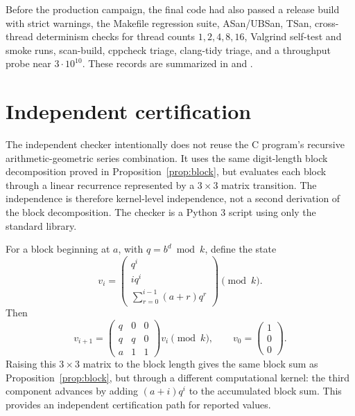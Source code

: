 \documentclass[11pt]{article}
\theoremstyle{definition}
\theoremstyle{remark}
\begin{document}
Before the production campaign, the final code had also passed a release
build with strict warnings, the Makefile regression suite, ASan/UBSan, TSan,
cross-thread determinism checks for thread counts \(1,2,4,8,16\), Valgrind
self-test and smoke runs, scan-build, cppcheck triage, clang-tidy triage, and
a throughput probe near \(3\cdot 10^{10}\).  These records are summarized in
 and
.

\section{Independent certification}
\label{sec:validation}

The independent checker  intentionally does
not reuse the C program's recursive arithmetic-geometric series combination.
It uses the same digit-length block decomposition proved in
Proposition~\ref{prop:block}, but evaluates each block through a linear
recurrence represented by a \(3\times 3\) matrix transition.  The independence is
therefore kernel-level independence,
not a second derivation of the block decomposition.  The checker is a Python 3
script using only the standard library.

For a block beginning at \(a\), with \(q=b^d\bmod k\), define the state
\[
  v_i=\begin{pmatrix}q^i\\ i q^i\\
  \sum_{r=0}^{i-1}(a+r)q^r\end{pmatrix}\pmod{k}.
\]
Then
\[
  v_{i+1} =
  \begin{pmatrix}
  q & 0 & 0\\
  q & q & 0\\
  a & 1 & 1
  \end{pmatrix}
  v_i \pmod{k},
  \qquad
  v_0=\begin{pmatrix}1\\0\\0\end{pmatrix}.
\]
Raising this \(3\times 3\) matrix to the block length gives the same block
sum as Proposition~\ref{prop:block}, but through a different computational
kernel: the third component advances by adding
\((a+i)q^i\) to the accumulated block sum.  This provides an independent
certification path for reported values.
\end{document}
